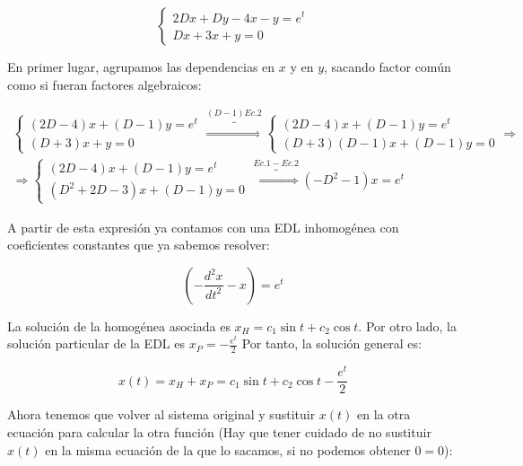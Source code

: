 \documentclass[a4paper,12pt,titlepage]{article}
\begin{document}
\begin{equation}
    \left\{ \begin{array}{l}
        2Dx + Dy -4x - y = e^t \\
        Dx + 3x + y = 0
    \end{array}
    \right.
\end{equation}

En primer lugar, agrupamos las dependencias en $x$ y en $y$, sacando factor común como si fueran factores algebraicos:

\begin{equation}
    \begin{gathered}
        \left\{ \begin{array}{l}
            (2D -4)x + (D-1)y = e^t\\
            (D +3)x + y = 0
        \end{array}
        \right. \overbrace{\Rightarrow}^{(D-1)Ec\text{.}2} 
        \left\{ \begin{array}{l}
            (2D -4)x + (D-1)y = e^t\\
            (D +3)(D-1)x + (D-1)y = 0
        \end{array}
        \right. \Rightarrow \\
        \Rightarrow \left\{ \begin{array}{l}
            (2D -4)x + (D-1)y = e^t\\
            (D^2 +2D - 3)x + (D-1)y = 0
        \end{array}
        \right. \overbrace{\Rightarrow}^{Ec\text{.}1-Ec\text{.}2} (-D^2-1)x=e^t
    \end{gathered}
\end{equation}

A partir de esta expresión ya contamos con una EDL inhomogénea con coeficientes constantes que ya sabemos resolver:

\begin{equation}
    (-\frac{d^2x}{dt^2} - x) = e^t
\end{equation}

La solución de la homogénea asociada es $x_H = c_1\sin t + c_2 \cos t$. Por otro lado, la solución particular de la EDL es $x_P = - \frac{e^t}{2}$ Por tanto, la solución general es:

\begin{equation}
    x(t) = x_H + x_P = c_1 \sin t + c_2 \cos t - \frac{e^t}{2}
\end{equation}

Ahora tenemos que volver al sistema original y sustituir $x(t)$ en la otra ecuación para calcular la otra función (Hay que tener cuidado de no sustituir $x(t)$ en la misma ecuación de la que lo sacamos, si no podemos obtener $0=0$):
\end{document}
